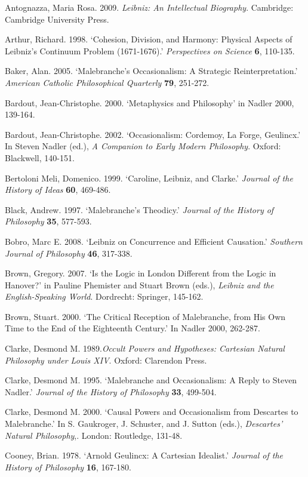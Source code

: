 \documentclass{article}
\begin{document}
Antognazza, Maria Rosa. 2009. \emph{Leibniz: An Intellectual Biography}.
Cambridge: Cambridge University Press.

Arthur, Richard. 1998. `Cohesion, Division, and Harmony: Physical
Aspects of Leibniz's Continuum Problem (1671-1676).' \emph{Perspectives
on Science} \textbf{6}, 110-135.

Baker, Alan. 2005. `Malebranche's Occasionalism: A Strategic
Reinterpretation.' \emph{American Catholic Philosophical Quarterly}
\textbf{79}, 251-272.

Bardout, Jean-Christophe. 2000. `Metaphysics and Philosophy' in Nadler
2000, 139-164.

Bardout, Jean-Christophe. 2002. `Occasionalism: Cordemoy, La Forge,
Geulincx.' In Steven Nadler (ed.), \emph{A Companion to Early Modern
Philosophy}. Oxford: Blackwell, 140-151.

Bertoloni Meli, Domenico. 1999. `Caroline, Leibniz, and Clarke.'
\emph{Journal of the History of Ideas} \textbf{60}, 469-486.

Black, Andrew. 1997. `Malebranche's Theodicy.' \emph{Journal of the
History of Philosophy} \textbf{35}, 577-593.

Bobro, Marc E. 2008. `Leibniz on Concurrence and Efficient Causation.'
\emph{Southern Journal of Philosophy} \textbf{46}, 317-338.

Brown, Gregory. 2007. `Is the Logic in London Different from the Logic
in Hanover?' in Pauline Phemister and Stuart Brown (eds.), \emph{Leibniz
and the English-Speaking World}. Dordrecht: Springer, 145-162.

Brown, Stuart. 2000. `The Critical Reception of Malebranche, from His
Own Time to the End of the Eighteenth Century.' In Nadler 2000, 262-287.

Clarke, Desmond M. 1989.\emph{Occult Powers and Hypotheses: Cartesian
Natural Philosophy under Louis XIV}. Oxford: Clarendon Press.

Clarke, Desmond M. 1995. `Malebranche and Occasionalism: A Reply to
Steven Nadler.' \emph{Journal of the History of Philosophy} \textbf{33},
499-504.

Clarke, Desmond M. 2000. `Causal Powers and Occasionalism from Descartes
to Malebranche.' In S. Gaukroger, J. Schuster, and J. Sutton (eds.),
\emph{Descartes' Natural Philosophy},. London: Routledge, 131-48.

Cooney, Brian. 1978. `Arnold Geulincx: A Cartesian Idealist.'
\emph{Journal of the History of Philosophy} \textbf{16}, 167-180.
\end{document}
